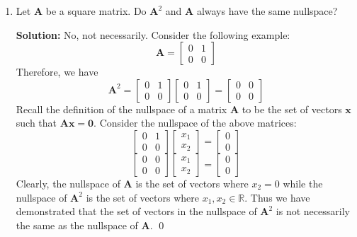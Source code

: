 \begin{enumerate}[label=(\alph*)]
	\item Let $\mathbf{A}$ be a square matrix. Do $\mathbf{A}^2$ and
	      $\mathbf{A}$ always have the same nullspace?

	      \par \textbf{Solution:}
	      No, not necessarily. Consider the following example:
	      $$ \mathbf{A} = \left[\begin{array}{cc}
				      0 & 1 \\
				      0 & 0
			      \end{array}\right] $$
	      Therefore, we have
	      $$ \mathbf{A}^2 =
		      \left[\begin{array}{cc}
				      0 & 1 \\
				      0 & 0
			      \end{array}\right]
		      \left[\begin{array}{cc}
				      0 & 1 \\
				      0 & 0
			      \end{array}\right]
		      =
		      \left[\begin{array}{cc}
				      0 & 0 \\
				      0 & 0
			      \end{array}\right]
	      $$
	      Recall the definition of the nullspace of a matrix $\mathbf{A}$ to be
	      the set of vectors $\mathbf{x}$ such that $\mathbf{Ax} = \mathbf{0}$.
	      Consider the nullspace of the above matrices:
	      $$
		      \left[\begin{array}{cc}
				      0 & 1 \\
				      0 & 0
			      \end{array}\right]
		      \left[\begin{array}{c}
				      x_1 \\
				      x_2
			      \end{array}\right]
		      =
		      \left[\begin{array}{c}
				      0 \\
				      0
			      \end{array}\right]
	      $$
	      $$
		      \left[\begin{array}{cc}
				      0 & 0 \\
				      0 & 0
			      \end{array}\right]
		      \left[\begin{array}{c}
				      x_1 \\
				      x_2
			      \end{array}\right]
		      =
		      \left[\begin{array}{c}
				      0 \\
				      0
			      \end{array}\right]
	      $$
	      Clearly, the nullspace of $\mathbf{A}$ is the set of vectors where
	      $x_2 = 0$ while the nullspace of $\mathbf{A}^2$ is the set of vectors
	      where $x_1, x_2 \in \mathbb{R}$. Thus we have demonstrated that the
	      set of vectors in the nullspace of $\mathbf{A}^2$ is not necessarily
	      the same as the nullspace of $\mathbf{A}$. \qed


\end{enumerate}

